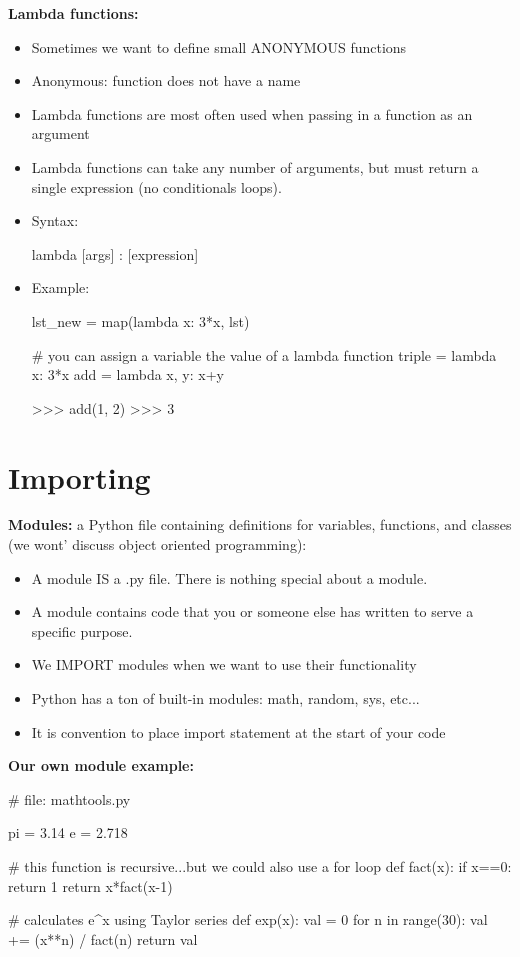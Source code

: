 \documentclass[12pt]{article}
\numberwithin{equation}{section}
\begin{document}
\textbf{Lambda functions:}
\begin{itemize}
    \item Sometimes we want to define small ANONYMOUS functions
    \item Anonymous: function does not have a name
    \item Lambda functions are most often used when passing in a function as an argument
    \item Lambda functions can take any number of arguments, but must return a single expression (no conditionals loops).
    \item Syntax:
    \begin{python}
    lambda [args] : [expression]
    \end{python}
    \item Example:
    \begin{python}
    lst_new = map(lambda x: 3*x, lst)
    
    # you can assign a variable the value of a lambda function
    triple = lambda x: 3*x
    add = lambda x, y: x+y
    
    >>> add(1, 2)
    >>> 3
    \end{python}
\end{itemize}

\section{Importing}

\textbf{Modules:} a Python file containing definitions for variables, functions, and classes (we wont' discuss object oriented programming):
\begin{itemize}
	\item A module IS a .py file. There is nothing special about a module.
	\item A module contains code that you or someone else has written to serve a specific purpose.
	\item We IMPORT modules when we want to use their functionality
	\item Python has a ton of built-in modules: math, random, sys, etc...
	\item It is convention to place import statement at the start of your code
\end{itemize}

\textbf{Our own module example:}
\begin{python}
# file: mathtools.py

pi = 3.14
e = 2.718

# this function is recursive...but we could also use a for loop
def fact(x):
	if x==0:
		return 1
	return x*fact(x-1)

# calculates e^x using Taylor series
def exp(x):
	val = 0
	for n in range(30):
		val += (x**n) / fact(n)
	return val
\end{python}
\end{document}
